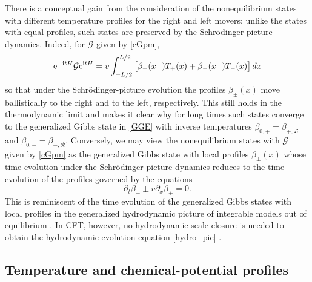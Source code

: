 \documentclass[12pt,a4paper]{article}
\newcommand{\ee}{{\rm e}}
\newcommand{\ii}{{\rm i}}
\newcommand{\cG}{\mathcal{G}}
\newcommand{\cL}{\mathcal{L}}
\newcommand{\cR}{\mathcal{R}}
\theoremstyle{definition}
\theoremstyle{remark}
\begin{document}
There is a conceptual gain from the consideration of the nonequilibrium states with different temperature profiles for the right and left movers: unlike the states with equal profiles, such states are preserved by the Schr\"odinger-picture dynamics.
Indeed, for $\cG$ given by \eqref{cGpm},
%
\begin{equation}
\ee^{-\ii tH}\cG\ee^{\ii tH}
= v \int_{-L/2}^{L/2}
	\left[ \beta_{+}(x^-)T_{+}(x) + \beta_{-}(x^+) T_{-}(x) \right] dx
\end{equation}
%
so that under the Schr{\"o}dinger-picture evolution the profiles $\beta_{\pm}(x)$ move ballistically to the right and to the left, respectively.
This still holds in the thermodynamic limit and makes it clear why for long times such states converge to the generalized Gibbs state in \eqref{GGE} with inverse temperatures $\beta_{0,+} = \beta_{+,\cL}$ and $\beta_{0,-} = \beta_{-,\cR}$.
Conversely, we may view the nonequilibrium states with $\cG$ given by \eqref{cGpm} as the generalized Gibbs state with local profiles $\beta_{\pm}(x)$ whose
time evolution under the Schr\"odinger-picture dynamics reduces to the
time evolution of the profiles governed by the equations
%
\begin{equation}
\label{hydro_pic}
\partial_{t} \beta_{\pm} \pm v \partial_{x} \beta_{\pm} = 0.
\end{equation}
%
This is reminiscent of the time evolution of the generalized Gibbs states
with local profiles in the generalized hydrodynamic picture 
of integrable models out of equilibrium
\cite{BCNF,CBT,BVKM2,DSpY,DSp,DoYo,IlDeN,CDDKY,Do}. 
In CFT, however, no hydrodynamic-scale closure is needed to obtain 
the hydrodynamic evolution equation \eqref{hydro_pic} \cite{BeDo2}.


\subsection{Temperature and chemical-potential profiles}
\label{subsec:4.3}
\end{document}
